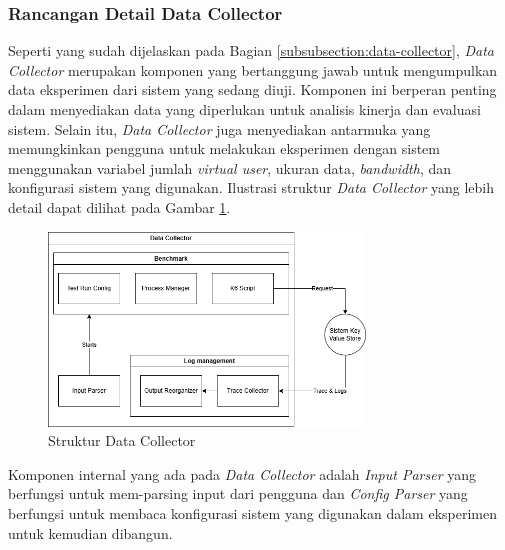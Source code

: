 \subsubsection{Rancangan Detail Data Collector}
\label{subsubsection:detail-data-collector}

Seperti yang sudah dijelaskan pada Bagian \ref{subsubsection:data-collector}, \textit{Data Collector} merupakan komponen yang bertanggung jawab untuk mengumpulkan data eksperimen dari sistem yang sedang diuji. Komponen ini berperan penting dalam menyediakan data yang diperlukan untuk analisis kinerja dan evaluasi sistem. Selain itu, \textit{Data Collector} juga menyediakan antarmuka yang memungkinkan pengguna untuk melakukan eksperimen dengan sistem menggunakan variabel jumlah \textit{virtual user}, ukuran data, \textit{bandwidth}, dan konfigurasi sistem yang digunakan. Ilustrasi struktur \textit{Data Collector} yang lebih detail dapat dilihat pada Gambar \ref{fig:data-collector-structure}.

\begin{figure}[ht]
    \centering
    \includegraphics[width=0.75\textwidth]{resources/chapter-3/data-collector-architecture.png}
    \caption{Struktur Data Collector}
    \label{fig:data-collector-structure}
\end{figure}

Komponen internal yang ada pada \textit{Data Collector} adalah \textit{Input Parser} yang berfungsi untuk mem-parsing input dari pengguna dan \textit{Config Parser} yang berfungsi untuk membaca konfigurasi sistem yang digunakan dalam eksperimen untuk kemudian dibangun.